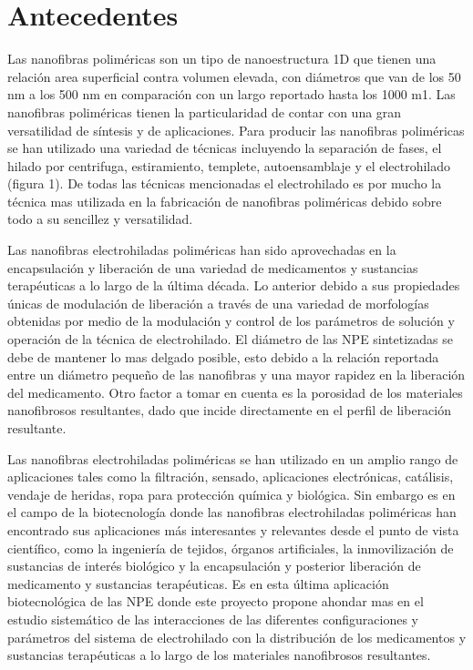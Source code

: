 \documentclass[a4paper,fleqn]{cas-sc}
\begin{document}
\section{Antecedentes}

Las nanofibras poliméricas son un tipo de nanoestructura 1D que tienen una relación area superficial contra volumen elevada, con diámetros que van de los 50 nm a los 500 nm en comparación con un largo reportado hasta los 1000 m1. Las nanofibras poliméricas tienen la particularidad de contar con una gran versatilidad de síntesis y de aplicaciones. Para producir las nanofibras poliméricas se han utilizado una variedad de técnicas incluyendo la separación de fases, el hilado por centrifuga, estiramiento, templete, autoensamblaje y el electrohilado (figura 1). De todas las técnicas mencionadas el electrohilado es por mucho la técnica mas utilizada en la fabricación de nanofibras poliméricas debido sobre todo a su sencillez y versatilidad.


Las nanofibras electrohiladas poliméricas han sido aprovechadas en la encapsulación y liberación de una variedad de medicamentos y sustancias terapéuticas a lo largo de la última década. Lo anterior debido a sus propiedades únicas de modulación de liberación a través de una variedad de morfologías obtenidas por medio de la modulación y control de los parámetros de solución y operación de la técnica de electrohilado. El diámetro de las NPE sintetizadas se debe de mantener lo mas delgado posible, esto debido a la relación reportada entre un diámetro pequeño de las nanofibras y una mayor rapidez en la liberación del medicamento. Otro factor a tomar en cuenta es la porosidad de los materiales nanofibrosos resultantes, dado que incide directamente en el perfil de liberación resultante.

Las nanofibras electrohiladas poliméricas se han utilizado en un amplio rango de aplicaciones tales como la filtración, sensado, aplicaciones electrónicas, catálisis, vendaje de heridas, ropa para protección química y biológica. Sin embargo es en el campo de la biotecnología donde las nanofibras electrohiladas poliméricas han encontrado sus aplicaciones más interesantes y relevantes desde el punto de vista científico, como la ingeniería de tejidos, órganos artificiales, la inmovilización de sustancias de interés biológico y la encapsulación y posterior liberación de medicamento y sustancias terapéuticas. Es en esta última aplicación biotecnológica de las NPE donde este proyecto propone ahondar mas en el estudio sistemático de las interacciones de las diferentes configuraciones y parámetros del sistema de electrohilado con la distribución de los medicamentos y sustancias terapéuticas a lo largo de los materiales nanofibrosos resultantes.
\end{document}
